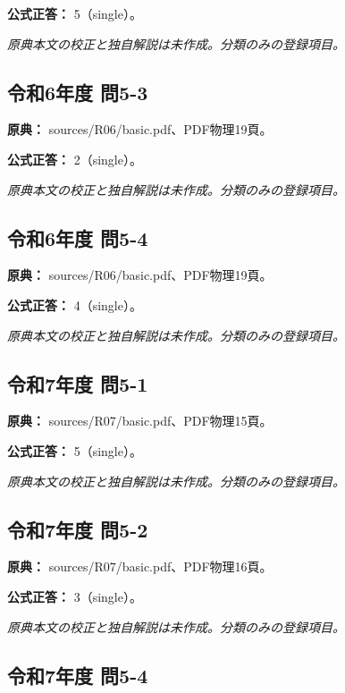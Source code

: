 \textbf{公式正答：} 5（single）。

\par\textit{原典本文の校正と独自解説は未作成。分類のみの登録項目。}

\subsection{令和6年度 問5-3}
\label{q:r06-reg-basic-5-3}

\noindent\textbf{原典：} sources/R06/basic.pdf、PDF物理19頁。

\textbf{公式正答：} 2（single）。

\par\textit{原典本文の校正と独自解説は未作成。分類のみの登録項目。}

\subsection{令和6年度 問5-4}
\label{q:r06-reg-basic-5-4}

\noindent\textbf{原典：} sources/R06/basic.pdf、PDF物理19頁。

\textbf{公式正答：} 4（single）。

\par\textit{原典本文の校正と独自解説は未作成。分類のみの登録項目。}

\subsection{令和7年度 問5-1}
\label{q:r07-reg-basic-5-1}

\noindent\textbf{原典：} sources/R07/basic.pdf、PDF物理15頁。

\textbf{公式正答：} 5（single）。

\par\textit{原典本文の校正と独自解説は未作成。分類のみの登録項目。}

\subsection{令和7年度 問5-2}
\label{q:r07-reg-basic-5-2}

\noindent\textbf{原典：} sources/R07/basic.pdf、PDF物理16頁。

\textbf{公式正答：} 3（single）。

\par\textit{原典本文の校正と独自解説は未作成。分類のみの登録項目。}

\subsection{令和7年度 問5-4}
\label{q:r07-reg-basic-5-4}

